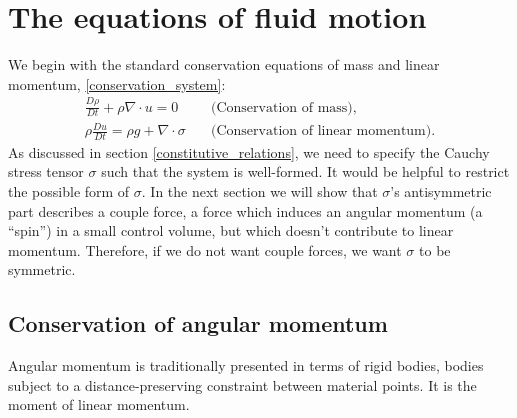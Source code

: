\section{The equations of fluid motion}
We begin with the standard conservation equations of mass and linear momentum, \eqref{conservation_system}:
\begin{equation}\label{compressible_system}
\begin{split}
    \frac{D\rho}{Dt} + \rho\nabla\cdot u = 0 &\quad\text{(Conservation of mass)},
    \\
    \rho\frac{Du}{Dt} = \rho g + \nabla\cdot\sigma &\quad\text{(Conservation of linear momentum)}.
\end{split}
\end{equation}
As discussed in section \ref{constitutive_relations}, we need to specify the Cauchy stress tensor $\sigma$ such that the system is well-formed.
It would be helpful to restrict the possible
form of $\sigma$. In the next section we will show that $\sigma$'s antisymmetric part describes a couple force, a force which induces an angular
momentum (a ``spin'') in a small control volume, but which doesn't contribute to linear momentum. Therefore, if we do not want couple forces,
we want $\sigma$ to be symmetric.
\subsection{Conservation of angular momentum}
Angular momentum is traditionally presented in terms of rigid bodies, bodies subject to a distance-preserving constraint between
material points. It is the moment of linear momentum.

